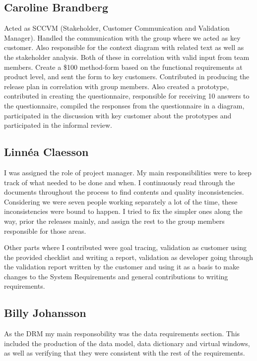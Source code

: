 \documentclass[10pt,a4paper]{article}
\begin{document}
\subsection{Caroline Brandberg}
Acted as SCCVM (Stakeholder, Customer Communication and Validation Manager). Handled the communication with the group where we acted as key customer. Also responsible for the context diagram with related text as well as the stakeholder analysis. Both of these in correlation with valid input from team members. Create a \$100 method-form based on the functional requirements at product level, and sent the form to key customers. Contributed in producing the release plan in correlation with group members.  Also created a prototype, contributed in creating the questionnaire, responsible for receiving 10 answers to the questionnaire, compiled the responses from the questionnaire in a diagram, participated in the discussion with key customer about the prototypes and participated in the informal review. 

\subsection{Linn\'ea Claesson}
I was assigned the role of project manager. My main responsibilities were to keep track of what needed to be done and when. I continuously read through the documents throughout the process to find contents and quality  inconsistencies. Considering we were seven people working separately a lot of the time, these inconsistencies were bound to happen. I tried to fix the simpler ones along the way, prior the releases mainly, and assign the rest to the group members responsible for those areas.

Other parts where I contributed were goal tracing, validation as customer using the provided checklist and writing a report, validation as developer going through the validation report written by the customer and using it as a basis to make changes to the System Requirements and general contributions to writing requirements.

\subsection{Billy Johansson}
As the DRM my main responsobility was the data requirements section. This included the production of the data model, data dictionary and virtual windows, as well as verifying that they were consistent with the rest of the requirements.
\end{document}

